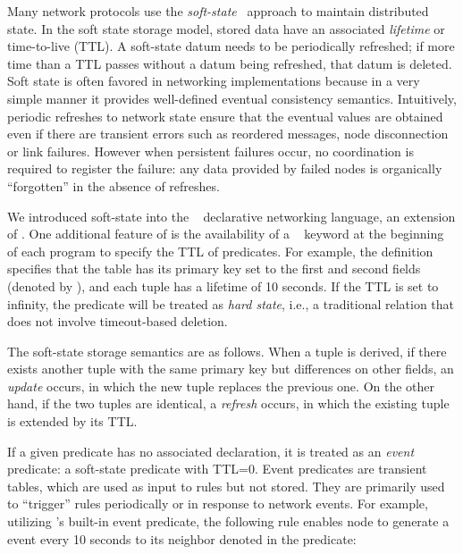 Many network protocols use the {\em soft-state}~\cite{clark88design}
approach to maintain distributed state. In the soft state storage
model, stored data have an associated {\em lifetime} or time-to-live
(TTL). A soft-state datum needs to be periodically refreshed; if more time
than a TTL passes without a datum being refreshed, that datum is deleted.  Soft
state is often favored in networking implementations because in a very
simple manner it provides well-defined eventual consistency
semantics. Intuitively, periodic refreshes to network state ensure
that the eventual values are obtained even if there are transient
errors such as reordered messages, node disconnection or link
failures.  However when persistent failures occur, no coordination is
required to register the failure: any data provided by failed nodes is
organically ``forgotten'' in the absence of refreshes.

We introduced soft-state into the \Overlog~\cite{declareOverlays}
declarative networking language, an extension of \Dlog. One additional
feature of \Overlog is the availability of a
~\cite{declareOverlays} keyword at the beginning of
each \Dlog program to specify the TTL of predicates. For example,
the definition  specifies that the
 table has its primary key set to the first and second
fields (denoted by ),
and each  tuple has a
lifetime of 10 seconds.  If the TTL is set to infinity, the predicate
will be treated as {\em hard state}, i.e., a traditional relation that does not involve timeout-based deletion.


The \Overlog soft-state storage semantics are as
follows. When a tuple is derived, if there exists another tuple with
the same primary key but differences on other fields, an {\em update}
occurs, in which the new tuple replaces the previous one. On the other
hand, if the two tuples are identical, a {\em refresh} occurs, in
which the existing tuple is extended by its TTL.

If a given predicate has no associated 
declaration, it is treated as an {\em event} predicate: a soft-state
predicate with TTL=0. Event predicates are transient tables, which are
used as input to rules but not stored. They are primarily used to
``trigger'' rules periodically or in response to network events. 
For example, utilizing \Overlog's
built-in  event predicate, the following rule enables node 
to generate a  event every 10 seconds to its neighbor 
denoted in the  predicate: 

